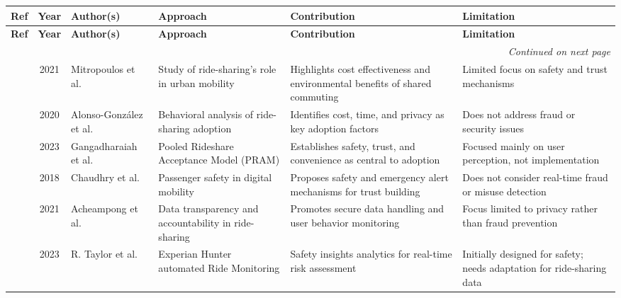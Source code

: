 \begin{longtable}{|c|c|l|
>{\raggedright\arraybackslash}p{3.2cm}|
>{\raggedright\arraybackslash}p{3.5cm}|
>{\raggedright\arraybackslash}p{3.5cm}|}


\hline
\textbf{Ref} & \textbf{Year} & \textbf{Author(s)} &
\textbf{Approach} & \textbf{Contribution} & \textbf{Limitation} \\
\hline
\endfirsthead

\hline
\textbf{Ref} & \textbf{Year} & \textbf{Author(s)} &
\textbf{Approach} & \textbf{Contribution} & \textbf{Limitation} \\
\hline
\endhead

\hline
\multicolumn{6}{r}{\textit{Continued on next page}} \\
\hline
\endfoot

\hline
\endlastfoot

\cite{mitropoulos2021} & 2021 & Mitropoulos et al. &
Study of ride-sharing’s role in urban mobility &
Highlights cost effectiveness and environmental benefits of shared commuting &
Limited focus on safety and trust mechanisms \\ \hline

\cite{alonso2020} & 2020 & Alonso-González et al. &
Behavioral analysis of ride-sharing adoption &
Identifies cost, time, and privacy as key adoption factors &
Does not address fraud or security issues \\ \hline

\cite{gangadharaiah2023} & 2023 & Gangadharaiah et al. &
Pooled Rideshare Acceptance Model (PRAM) &
Establishes safety, trust, and convenience as central to adoption &
Focused mainly on user perception, not implementation \\ \hline

\cite{chaudhry2018} & 2018 & Chaudhry et al. &
Passenger safety in digital mobility &
Proposes safety and emergency alert mechanisms for trust building &
Does not consider real-time fraud or misuse detection \\ \hline

\cite{acheampong2021} & 2021 & Acheampong et al. &
Data transparency and accountability in ride-sharing &
Promotes secure data handling and user behavior monitoring &
Focus limited to privacy rather than fraud prevention \\ \hline

\cite{taylor2023} & 2023 & R. Taylor et al. &
Experian Hunter automated Ride Monitoring &
Safety insights analytics for real-time risk assessment &
Initially designed for safety; needs adaptation for ride-sharing data \\ \hline


\end{longtable}
